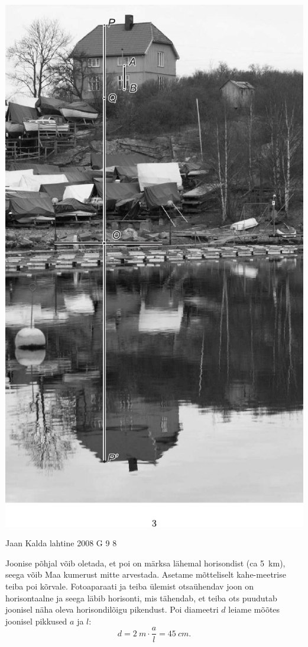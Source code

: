 \documentclass[11pt]{article}
\begin{document}
{{\begin{center}
	\includegraphics[height=\textheight]{2008-v3g-04-lah}
\end{center}
\fi
}

{Jaan Kalda} %
{lahtine} %
{2008} %
{G 9} %
{8} %
{

\ifSolution
Joonise põhjal võib oletada, et poi on märksa lähemal horisondist (ca \SI{5}{km}), seega võib Maa kumerust mitte arvestada. Asetame mõtteliselt kahe-meetrise teiba poi kõrvale. Fotoaparaati ja teiba ülemist otsaühendav joon on horisontaalne ja seega läbib horisonti, mis tähendab, et teiba ots puudutab joonisel näha oleva horisondilõigu pikendust. Poi diameetri $d$ leiame mõõtes joonisel pikkused $a$ ja $l$:
\[
d = \SI{2}{m} \cdot \frac al = \SI{45}{cm}.
\]

}}
\end{document}
